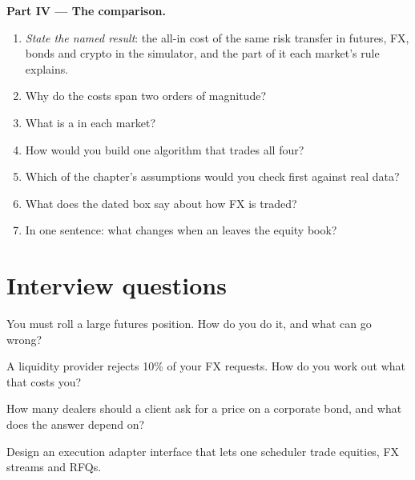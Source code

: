 \begin{problem}
\medskip\noindent\textbf{Part IV --- The comparison.}
\begin{enumerate}[resume]
\item \emph{State the named result}: the all-in cost of the same risk transfer in futures, FX, bonds and crypto in the simulator, and the part of it
each market's rule explains.
\item Why do the costs span two orders of magnitude?
\item What is a  in each market?
\item How would you build one algorithm that trades all four?
\item Which of the chapter's assumptions would you check first against real data?
\item What does the dated box say about how FX is traded?
\item In one sentence: what changes when an  leaves the equity book?
\end{enumerate}
\end{problem}

\section{Interview questions}

\begin{interviewq}\label{iq:mx:execution-beyond-equities:1}
You must roll a large futures position. How do you do it, and what can go wrong?
\end{interviewq}

\begin{interviewq}\label{iq:mx:execution-beyond-equities:2}
A liquidity provider rejects 10\% of your FX requests. How do you work out what that costs you?
\end{interviewq}

\begin{interviewq}\label{iq:mx:execution-beyond-equities:3}
How many dealers should a client ask for a price on a corporate bond, and what does the answer depend on?
\end{interviewq}

\begin{interviewq}\label{iq:mx:execution-beyond-equities:4}
Design an execution adapter interface that lets one scheduler trade equities, FX streams and RFQs.
\end{interviewq}

